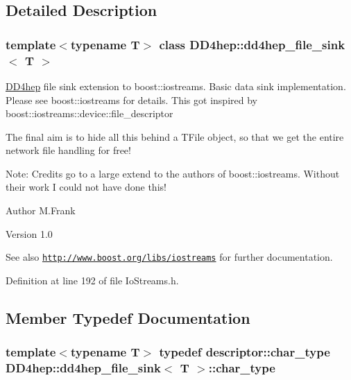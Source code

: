 \subsection{Detailed Description}
\subsubsection*{template$<$typename T$>$ class DD4hep::dd4hep\_\-file\_\-sink$<$ T $>$}

\hyperlink{namespace_d_d4hep}{DD4hep} file sink extension to boost::iostreams. Basic data sink implementation. Please see boost::iostreams for details. This got inspired by boost::iostreams::device::file\_\-descriptor

The final aim is to hide all this behind a TFile object, so that we get the entire network file handling for free!

Note: Credits go to a large extend to the authors of boost::iostreams. Without their work I could not have done this!

\begin{DoxyAuthor}{Author}
M.Frank 
\end{DoxyAuthor}
\begin{DoxyVersion}{Version}
1.0
\end{DoxyVersion}
\begin{DoxySeeAlso}{See also}
\href{http://www.boost.org/libs/iostreams}{\tt http://www.boost.org/libs/iostreams} for further documentation. 
\end{DoxySeeAlso}


Definition at line 192 of file IoStreams.h.

\subsection{Member Typedef Documentation}
\hypertarget{class_d_d4hep_1_1dd4hep__file__sink_a358c907508083da65c4cd31725331460}{
\subsubsection[{char\_\-type}]{\setlength{\rightskip}{0pt plus 5cm}template$<$typename T$>$ typedef {\bf descriptor::char\_\-type} {\bf DD4hep::dd4hep\_\-file\_\-sink}$<$ {\bf T} $>$::{\bf char\_\-type}}}
\label{class_d_d4hep_1_1dd4hep__file__sink_a358c907508083da65c4cd31725331460}


